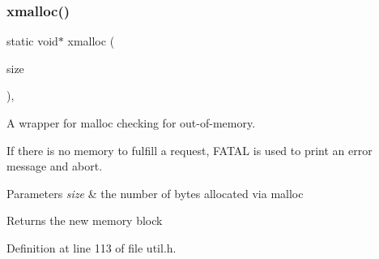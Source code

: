 \subsubsection{\texorpdfstring{xmalloc()}{xmalloc()}}
{\footnotesize\ttfamily static void$\ast$ xmalloc (\begin{DoxyParamCaption}\item[{size\+\_\+t}]{size }\end{DoxyParamCaption})\hspace{0.3cm}{\ttfamily [inline]}, {\ttfamily [static]}}



A wrapper for malloc checking for out-\/of-\/memory. 

If there is no memory to fulfill a request, F\+A\+T\+AL is used to print an error message and abort.


\begin{DoxyParams}{Parameters}
{\em size} & the number of bytes allocated via malloc \\
\hline
\end{DoxyParams}
\begin{DoxyReturn}{Returns}
the new memory block 
\end{DoxyReturn}


Definition at line 113 of file util.\+h.


